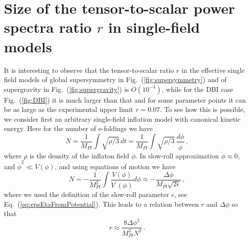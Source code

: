 \documentclass[12pt]{article}
\begin{document}
\section{Size of the tensor-to-scalar power spectra ratio $r$ in single-field models \label{sec:r}}
It is interesting to observe that the tensor-to-scalar ratio $r$ in the effective single field models of global supersymmetry in Fig.~(\ref{fig:supersymmetry}) and of supergravity in Fig.~(\ref{fig:supergravity}) is $O\left(10^{-4}\right)$, while for the DBI case Fig.~(\ref{fig:DBI}) it is much larger than that and for some parameter points it can be as large as the experimental upper limit $r = 0.07$.
To see how this is possible, we consider first an arbitrary single-field inflation model with canonical kinetic energy.
Here for the number of e-foldings we have
\begin{equation} \label{eq:efoldingsGeneral}
  N = \frac{1}{M_{Pl}} \int \sqrt{\rho / 3}\,dt
    = \frac{1}{M_{Pl}} \int \sqrt{\rho / 3}\,\frac{d\phi}{\dot \phi}\,,
\end{equation}
where $\rho$ is the density of the inflaton field $\phi$.
In slow-roll approximation $\ddot \phi \approx 0$, and ${\dot \phi}^2 \ll V\left(\phi\right)$, and using equations of motion we have
\begin{equation} \label{eq:efoldingsCanonical}
  N = - \frac{1}{M_{Pl}^2} \int \frac{V\left(\phi\right)}{V^\prime\left(\phi\right)} d\phi
    \approx - \frac{\Delta \phi}{M_{Pl} \sqrt{2 \epsilon}}\,,
\end{equation}
where we used the definition of the slow-roll parameter $\epsilon$, see Eq.~(\ref{eq:epsEtaFromPotential}).
This leads to a relation between $r$ and $\Delta \phi$ so that
\begin{equation} \label{eq:Deltaphi}
  r \approx \frac{8 \Delta\phi^2}{M_{Pl}^2 N^2}\,.
\end{equation}
\end{document}
